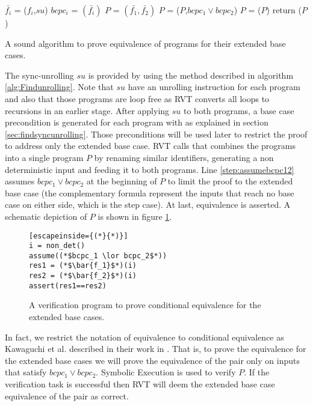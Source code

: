 \noindent
\begin{algorithm}
\begin{minipage}{\linewidth}
\begin{algorithmic}[1]
    \label{step:foreach_p}
	\State$\bar{f_i}$ = ($f_i$,$su$)
	\State $bcpc_i$ = $(\bar{f_i})$
	\EndFor
	\State $P$ = $(\bar{f_1},\bar{f_2})$
    \State $P$ = ($P$,$bcpc_1 \lor bcpc_2$) \label{step:assumebcpc12}
    \State $P$ = ($P$)
    \State return ($P$)
	\EndFunction
\end{algorithmic}
\end{minipage}
\caption{A sound algorithm to prove equivalence of programs for their extended base cases.}
\label{alg:ExtendedBaseProof}
\end{algorithm}
The sync-unrolling $su$ is provided by using the method described in algorithm \ref{alg:Findunrolling}. Note that $su$ have an unrolling instruction for each program and also that those programs are loop free as RVT converts all loops to recursions in an earlier stage. After applying $su$ to both programs, a base case precondition is generated for each program with  as explained in section \ref{sec:findsyncunrolling}. Those preconditions will be used later to restrict the proof to address only the extended base case. RVT calls  that combines the programs into a single program $P$ by renaming similar identifiers, generating a non deterministic input and feeding it to both programs. Line \ref{step:assumebcpc12} assumes $bcpc_1 \lor bcpc_2$ at the beginning of $P$ to limit the proof to the extended base case (the complementary formula represent the inputs that reach no base case on either side, which is the step case). At last, equivalence is asserted. A schematic depiction of $P$ is shown in figure \ref{fig:basegapvefprogram}. 
\begin{figure} [h]
\begin{center}
\begin{minipage}{7 cm}
\begin{lstlisting}[escapeinside={(*}{*)}]
i = non_det()
assume((*$bcpc_1 \lor bcpc_2$*))
res1 = (*$\bar{f_1}$*)(i)
res2 = (*$\bar{f_2}$*)(i)
assert(res1==res2)
\end{lstlisting}
\end{minipage}
\caption{A verification program to prove conditional equivalence for the extended base cases.}
\label{fig:basegapvefprogram}
\end{center}
\end{figure}
In fact, we restrict the notation of equivalence to conditional equivalence as Kawaguchi et al. described in their work in \cite{kawaguchi2010conditional}. That is, to prove the equivalence for the extended base cases we will prove the equivalence of the pair only on inputs that satisfy $bcpc_1 \lor bcpc_2$. Symbolic Execution is used to verify $P$. If the verification task is successful then RVT will deem the extended base case equivalence of the pair as correct. 

